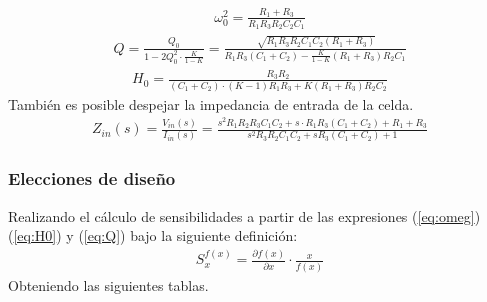 \begin{align}
\omega_0^2= \frac{R_1+R_3}{R_1R_3R_2C_2C_1}
\label{eq:omeg}
\end{align}
\begin{align}
Q=\frac{Q_0}{1-2Q_0^2\cdot \frac{K}{1-K}}=\frac{\sqrt[]{R_1R_3R_2C_1C_2(R_1+R_3)}}{R_1R_3(C_1+C_2)-\frac{K}{1-K}(R_1+R_3)R_2C_1}
\label{eq:Q}
\end{align}
\begin{align}
H_0=\frac{R_3R_2}{(C_1+C_2)\cdot (K-1)R_1R_3+K(R_1+R_3)R_2 C_2}
\label{eq:H0}
\end{align}
También es posible despejar la impedancia de entrada de la celda.
\begin{align}
Z_{in}(s)=\frac{V_{in}(s)}{I_{in}(s)}= \frac{s^2 R_1R_2R_3C_1C_2+s\cdot R_1R_3(C_1+C_2)+R_1+R_3}{s^2R_3R_2C_1C_2+sR_3(C_1+C_2)+1}
\end{align}
\subsubsection{Elecciones de diseño}
Realizando el cálculo de sensibilidades a partir de las expresiones (\ref{eq:omeg}) (\ref{eq:H0}) y (\ref{eq:Q}) bajo la siguiente definición:
\begin{align}
S_x^{f(x)}= \frac{\partial f(x)}{\partial x}\cdot \frac{x}{f(x)}
\end{align}
Obteniendo las siguientes tablas.

